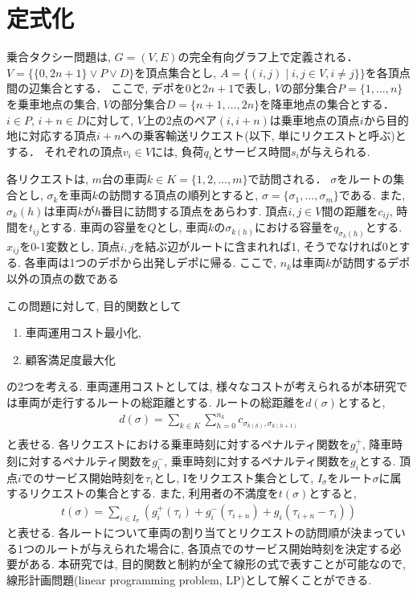 \chapter{定式化}\label{formulation}
乗合タクシー問題は, $G = (V, E)$の完全有向グラフ上で定義される．$V =\{\{0,2n+1\} \lor P \lor D\}$を頂点集合とし, $A = \{(i,j) \mid i,j\in V ,i \neq j\}\}$を各頂点間の辺集合とする．
ここで, デポを$0$と$2n+1$で表し, $V$の部分集合$P =\{1,\ldots,n \}$を乗車地点の集合, $V$の部分集合$D =\{n+1,\ldots,2n \}$を降車地点の集合とする．
$i \in P$, $i+n \in D$に対して, $V$上の2点のペア$(i,i+n)$は乗車地点の頂点$i$から目的地に対応する頂点$i+n$への乗客輸送リクエスト(以下, 単にリクエストと呼ぶ)とする．
それぞれの頂点$v_i \in V$には, 負荷$q_i$とサービス時間$s_i$が与えられる.

各リクエストは, $m$台の車両$k \in K = \{1,2,\ldots,m\}$で訪問される．
$\sigma$をルートの集合とし, $\sigma_k$を車両$k$の訪問する頂点の順列とすると, $\sigma = \{\sigma_1,\ldots,\sigma_m\}$である. また, $\sigma_k(h)$は車両$k$が$h$番目に訪問する頂点をあらわす.
頂点$i,j \in V$間の距離を$c_{ij}$, 時間を$t_{ij}$とする.
車両の容量を$Q$とし, 車両$k$の$\sigma _{k(h)}$における容量を$q_{\sigma_k(h)}$とする.
$x_{ij}$を0-1変数とし, 頂点$i,j$を結ぶ辺がルートに含まれれば1, そうでなければ0とする.
各車両は1つのデポから出発しデポに帰る. ここで, $n_k$は車両$k$が訪問するデポ以外の頂点の数である

この問題に対して, 目的関数として
\begin{enumerate}
 \item 車両運用コスト最小化, 
 \item 顧客満足度最大化
\end{enumerate}
の2つを考える. 車両運用コストとしては, 様々なコストが考えられるが本研究では車両が走行するルートの総距離とする. ルートの総距離を$d(\sigma)$とすると,
\begin{align*}
d(\sigma) = \sum_ {k\in K} \sum_{h=0}^{n_k} c_ {\sigma_{k(h)},\sigma_ {k(h+1)} }\\
\end{align*}
と表せる.
各リクエストにおける乗車時刻に対するペナルティ関数を$g^+_i$, 降車時刻に対するペナルティ関数を$g^-_i$, 乗車時刻に対するペナルティ関数を$g_i$とする.
頂点$i$でのサービス開始時刻を$\tau_i$とし, Iをリクエスト集合として, $I_\sigma$をルート$\sigma$に属するリクエストの集合とする.
また, 利用者の不満度を$t(\sigma)$とすると,
\begin{align*}
t(\sigma) = \sum_ {i \in I_\sigma} (g^+_i(\tau_i)+g^-_i(\tau_{i+n})+g_i(\tau_{i+n}-\tau_i))
\end{align*}
と表せる. 各ルートについて車両の割り当てとリクエストの訪問順が決まっている1つのルートが与えられた場合に, 各頂点でのサービス開始時刻を決定する必要がある. 本研究では, 目的関数と制約が全て線形の式で表すことが可能なので, 線形計画問題(linear programming problem, LP)として解くことができる.

